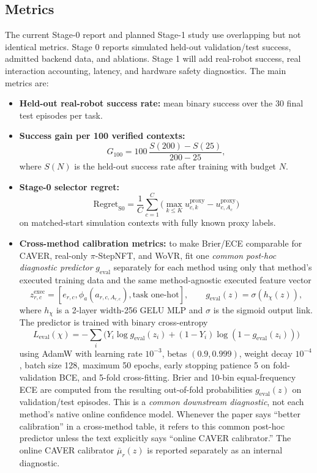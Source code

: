 \documentclass[10pt]{article}
\theoremstyle{plain}
\theoremstyle{definition}
\theoremstyle{remark}
\begin{document}
\subsection{Metrics}
The current Stage-0 report and planned Stage-1 study use overlapping but not identical metrics. Stage 0 reports simulated held-out validation/test success, admitted backend data, and ablations. Stage 1 will add real-robot success, real interaction accounting, latency, and hardware safety diagnostics. The main metrics are:
\begin{itemize}
    \item \textbf{Held-out real-robot success rate:} mean binary success over the 30 final test episodes per task.
    \item \textbf{Success gain per 100 verified contexts:}
    \[
    G_{100}=100\,\frac{S(200)-S(25)}{200-25},
    \]
    where $S(N)$ is the held-out success rate after training with budget $N$.
    \item \textbf{Stage-0 selector regret:}
    \[
    \mathrm{Regret}_{\mathrm{S0}}=\frac{1}{C}\sum_{c=1}^{C}\Big(\max_{k\le K}u^{\mathrm{proxy}}_{c,k}-u^{\mathrm{proxy}}_{c,A_c}\Big)
    \]
    on matched-start simulation contexts with fully known proxy labels.
    \item \textbf{Cross-method calibration metrics:} to make Brier/ECE comparable for CAVER, real-only $\pi$-StepNFT, and WoVR, fit one \emph{common post-hoc diagnostic predictor} $g_{\mathrm{eval}}$ separately for each method using only that method's executed training data and the same method-agnostic executed feature vector
    \[
    z^{\mathrm{exec}}_{r,c}=[e_{r,c},\phi_a(a_{r,c,A_{r,c}}),\text{task one-hot}],
    \qquad
    g_{\mathrm{eval}}(z)=\sigma(h_{\chi}(z)),
    \]
    where $h_{\chi}$ is a 2-layer width-256 GELU MLP and $\sigma$ is the sigmoid output link. The predictor is trained with binary cross-entropy
    \[
    L_{\mathrm{eval}}(\chi)=
    -\sum_i\Big(Y_i\log g_{\mathrm{eval}}(z_i)+(1-Y_i)\log(1-g_{\mathrm{eval}}(z_i))\Big)
    \]
    using AdamW with learning rate $10^{-3}$, betas $(0.9,0.999)$, weight decay $10^{-4}$, batch size 128, maximum 50 epochs, early stopping patience 5 on fold-validation BCE, and 5-fold cross-fitting. Brier and 10-bin equal-frequency ECE are computed from the resulting out-of-fold probabilities $g_{\mathrm{eval}}(z)$ on validation/test episodes. This is a \emph{common downstream diagnostic}, not each method's native online confidence model. Whenever the paper says ``better calibration'' in a cross-method table, it refers to this common post-hoc predictor unless the text explicitly says ``online CAVER calibrator.'' The online CAVER calibrator $\bar\mu_r(z)$ is reported separately as an internal diagnostic.

\end{itemize}
\end{document}
